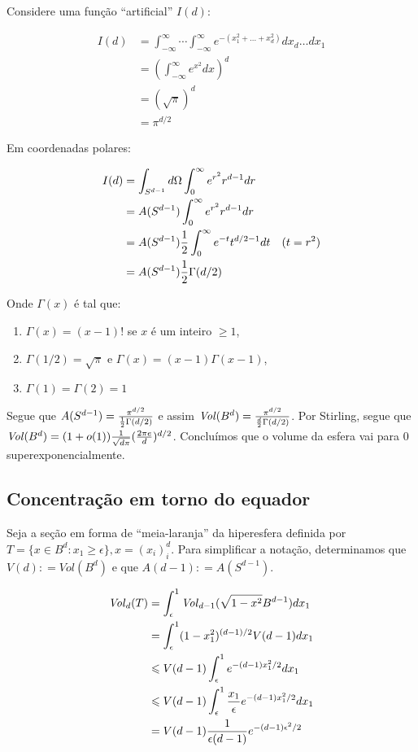Considere uma função “artificial” $I(d)$:

\begin{align*}
  I(d)&= \int_{-\infty}^{\infty} \cdots \int_{-\infty}^{\infty} e^{-(x_1^2 + \dots + x_d^2)} dx_d \dots dx_1 \\
      &= (\int_{-\infty}^{\infty} e^{x^2}dx)^d \\
      &= (\sqrt{\pi})^d \\
      &= \pi^{d/2}
\end{align*}

Em coordenadas polares:

\begin{align*}
  I(d)&= \int_{S^{d-1}} d\Omega \int_0^\infty e^{r^2} r^{d-1} dr \\
      &= A(S^{d-1}) \int_0^\infty e^{r^2} r^{d-1} dr \\
      &= A(S^{d-1}) {1\over 2} \int_0^\infty e^{-t} t^{d/2 - 1} dt & (t = r^2)\\
      &= A(S^{d-1}) {1\over 2} \Gamma (d/2)
\end{align*}

Onde $\Gamma(x)$ é tal que:

\begin{enumerate}
\item $\Gamma(x) = (x-1)!$ se $x$ é um inteiro $\geqslant 1$,
\item $\Gamma(1/2) = \sqrt{\pi}$ e $\Gamma(x) = (x-1)\Gamma(x-1)$,
\item $\Gamma(1) = \Gamma(2) = 1$
\end{enumerate}

Segue que $A(S^{d-1}) = {\pi^{d/2} \over {1\over 2} \Gamma (d/2)}$ e assim $\mathit{Vol}(B^d) = {\pi^{d/2} \over {d\over 2} \Gamma (d/2)}$. Por Stirling, segue que $\mathit{Vol}(B^d) = (1 + o(1)) {1 \over \sqrt{d\pi}} ({2 \pi e \over d})^{d/2}$. Concluímos que o volume da esfera vai para 0 superexponencialmente.

\subsection{Concentração em torno do equador}

Seja a seção em forma de “meia-laranja” da hiperesfera definida por $T = \{x \in B^d: x_1 \geqslant \epsilon\}, x = (x_i)_i^d$. Para simplificar a notação, determinamos que $V(d)\colon = \mathit{Vol}(B^d)$ e que $A(d-1)\colon = A(S^{d-1})$.

\begin{align*}
  \mathit{Vol}_d(T) &= \int_\epsilon^1 \mathit{Vol}_{d-1}(\sqrt{1-x^2}B^{d-1}) dx_1 \\
      &= \int_\epsilon^1 (1-x_1^2)^{(d-1)/2} V(d-1) dx_1 \\
      &\leqslant V(d-1) \int_\epsilon^1 e^{-(d-1)x_1^2/2} dx_1 \\
      &\leqslant V(d-1) \int_\epsilon^1 {x_1 \over \epsilon} e^{-(d-1)x_1^2/2} dx_1 \\
      &= V(d-1) {1\over \epsilon(d-1)} e^{-(d-1)\epsilon^2/2}
\end{align*}

